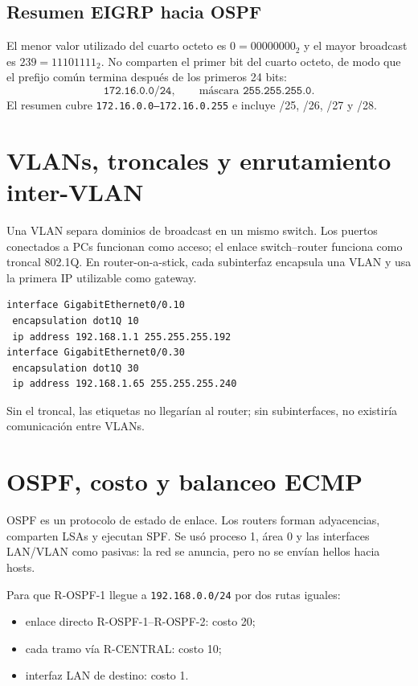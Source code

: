 \documentclass[11pt]{article}
\begin{document}
\subsection{Resumen EIGRP hacia OSPF}
El menor valor utilizado del cuarto octeto es $0=00000000_2$ y el mayor broadcast es $239=11101111_2$. No comparten el primer bit del cuarto octeto, de modo que el prefijo común termina después de los primeros 24 bits:
\[
\boxed{\texttt{172.16.0.0/24}},\qquad
\text{máscara }\texttt{255.255.255.0}.
\]
El resumen cubre \texttt{172.16.0.0--172.16.0.255} e incluye /25, /26, /27 y /28.

\section{VLANs, troncales y enrutamiento inter-VLAN}

Una VLAN separa dominios de broadcast en un mismo switch. Los puertos conectados a PCs funcionan como acceso; el enlace switch--router funciona como troncal 802.1Q. En router-on-a-stick, cada subinterfaz encapsula una VLAN y usa la primera IP utilizable como gateway.

\begin{verbatim}
interface GigabitEthernet0/0.10
 encapsulation dot1Q 10
 ip address 192.168.1.1 255.255.255.192
interface GigabitEthernet0/0.30
 encapsulation dot1Q 30
 ip address 192.168.1.65 255.255.255.240
\end{verbatim}

Sin el troncal, las etiquetas no llegarían al router; sin subinterfaces, no existiría comunicación entre VLANs.

\section{OSPF, costo y balanceo ECMP}

OSPF es un protocolo de estado de enlace. Los routers forman adyacencias, comparten LSAs y ejecutan SPF. Se usó proceso 1, área 0 y las interfaces LAN/VLAN como pasivas: la red se anuncia, pero no se envían hellos hacia hosts.

Para que R-OSPF-1 llegue a \texttt{192.168.0.0/24} por dos rutas iguales:
\begin{itemize}
\item enlace directo R-OSPF-1--R-OSPF-2: costo 20;
\item cada tramo vía R-CENTRAL: costo 10;
\item interfaz LAN de destino: costo 1.
\end{itemize}
\end{document}
